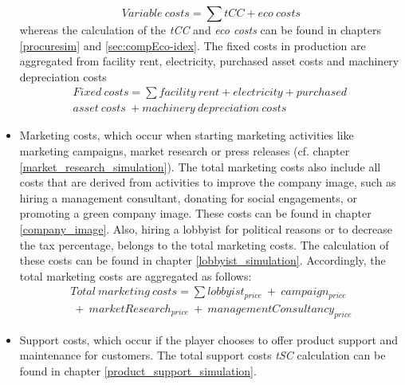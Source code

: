 \begin{itemize}
\begin{equation}
        Variable \ costs = \sum tCC + eco \ costs
    \end{equation}
    whereas the calculation of the \textit{tCC} and \textit{eco costs} can be found in chapters \ref{procuresim} and \ref{sec:compEco-idex}. The fixed costs in production are aggregated from facility rent, electricity, purchased asset costs and machinery depreciation costs
    \begin{equation}
    \begin{split}
        Fixed \ costs = \sum facility \ rent + electricity + purchased \ \\ asset \ costs \ + machinery \ depreciation \ costs
    \end{split}
    \end{equation}
    \item Marketing costs, which occur when starting marketing activities like marketing campaigns, market research or press releases (cf. chapter \ref{market_research_simulation}). The total marketing costs also include all costs that are derived from activities to improve the company image, such as hiring a management consultant, donating for social engagements, or promoting a green company image. These costs can be found in chapter \ref{company_image}. Also, hiring a lobbyist for political reasons or to decrease the tax percentage, belongs to the total marketing costs. The calculation of these costs can be found in chapter \ref{lobbyist_simulation}. Accordingly, the total marketing costs are aggregated as follows:
    \begin{equation}
    \begin{split}
        Total \ marketing \ costs = \sum lobbyist_{price} \ + \ campaign_{price} \\\ + \ marketResearch_{price} \ + \  managementConsultancy_{price}
    \end{split}
    \end{equation}
    \item Support costs, which occur if the player chooses to offer product support and maintenance for customers. The total support costs \textit{tSC} calculation can be found in chapter \ref{product_support_simulation}.
\end{itemize}

